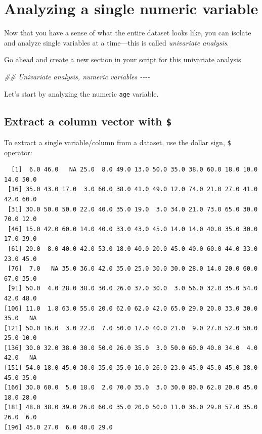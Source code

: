 \documentclass[
  letterpaper,
  DIV=11,
  numbers=noendperiod]{scrreprt}
\newenvironment{Shaded}{\begin{snugshade}}{\end{snugshade}}
\newcommand{\CommentTok}[1]{\textcolor[rgb]{0.37,0.37,0.37}{#1}}
\newcommand{\DocumentationTok}[1]{\textcolor[rgb]{0.37,0.37,0.37}{\textit{#1}}}
\newcommand{\NormalTok}[1]{\textcolor[rgb]{0.00,0.23,0.31}{#1}}
\newcommand{\SpecialCharTok}[1]{\textcolor[rgb]{0.37,0.37,0.37}{#1}}
\begin{document}
\hypertarget{analyzing-a-single-numeric-variable}{%
\section{Analyzing a single numeric
variable}\label{analyzing-a-single-numeric-variable}}

Now that you have a sense of what the entire dataset looks like, you can
isolate and analyze single variables at a time---this is called
\emph{univariate analysis}.

Go ahead and create a new section in your script for this univariate
analysis.

\begin{Shaded}
\begin{Highlighting}[]
\DocumentationTok{\#\# Univariate analysis, numeric variables {-}{-}{-}{-}}
\end{Highlighting}
\end{Shaded}

Let's start by analyzing the numeric \texttt{age} variable.

\hypertarget{extract-a-column-vector-with}{%
\subsection{\texorpdfstring{Extract a column vector with
\texttt{\$}}{Extract a column vector with \$}}\label{extract-a-column-vector-with}}

To extract a single variable/column from a dataset, use the dollar sign,
\texttt{\$} operator:

\begin{Shaded}
\end{Shaded}

\begin{verbatim}
  [1]  6.0 46.0   NA 25.0  8.0 49.0 13.0 50.0 35.0 38.0 60.0 18.0 10.0 14.0 50.0
 [16] 35.0 43.0 17.0  3.0 60.0 38.0 41.0 49.0 12.0 74.0 21.0 27.0 41.0 42.0 60.0
 [31] 30.0 50.0 50.0 22.0 40.0 35.0 19.0  3.0 34.0 21.0 73.0 65.0 30.0 70.0 12.0
 [46] 15.0 42.0 60.0 14.0 40.0 33.0 43.0 45.0 14.0 14.0 40.0 35.0 30.0 17.0 39.0
 [61] 20.0  8.0 40.0 42.0 53.0 18.0 40.0 20.0 45.0 40.0 60.0 44.0 33.0 23.0 45.0
 [76]  7.0   NA 35.0 36.0 42.0 35.0 25.0 30.0 30.0 28.0 14.0 20.0 60.0 67.0 35.0
 [91] 50.0  4.0 28.0 38.0 30.0 26.0 37.0 30.0  3.0 56.0 32.0 35.0 54.0 42.0 48.0
[106] 11.0  1.8 63.0 55.0 20.0 62.0 62.0 42.0 65.0 29.0 20.0 33.0 30.0 35.0   NA
[121] 50.0 16.0  3.0 22.0  7.0 50.0 17.0 40.0 21.0  9.0 27.0 52.0 50.0 25.0 10.0
[136] 30.0 32.0 38.0 30.0 50.0 26.0 35.0  3.0 50.0 60.0 40.0 34.0  4.0 42.0   NA
[151] 54.0 18.0 45.0 30.0 35.0 35.0 16.0 26.0 23.0 45.0 45.0 45.0 38.0 45.0 35.0
[166] 30.0 60.0  5.0 18.0  2.0 70.0 35.0  3.0 30.0 80.0 62.0 20.0 45.0 18.0 28.0
[181] 48.0 38.0 39.0 26.0 60.0 35.0 20.0 50.0 11.0 36.0 29.0 57.0 35.0 26.0  6.0
[196] 45.0 27.0  6.0 40.0 29.0
\end{verbatim}
\end{document}
